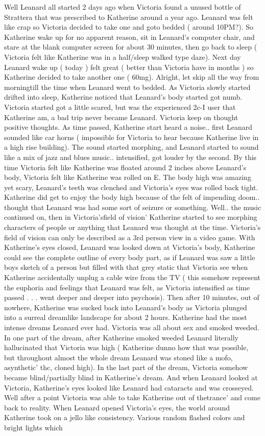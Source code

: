 \documentclass[12pt]{book}
\begin{document}
Well Leanard all started 2 days ago when Victoria found a unused bottle of Strattera that was prescribed to Katherine around a year ago. Leanard was felt like crap so Victoria decided to take one and goto bedded ( around 10PM?). So Katherine wake up for no apparent reason, sit in Leanard's computer chair, and stare at the blank computer screen for about 30 minutes, then go back to sleep ( Victoria felt like Katherine was in a half/sleep walked type daze). Next day Leanard wake up ( today ) felt great ( better than Victoria have in months ) so Katherine decided to take another one ( 60mg). Alright, let skip all the way from morningtill the time when Leanard went to bedded. As Victoria slowly started drifted into sleep, Katherine noticed that Leanard's body started got numb. Victoria started got a little scared, but was the experienced 2c-I user that Katherine am, a bad trip never became Leanard. Victoria keep on thought positive thoughts. As time passed, Katherine start heard a noise.. first Leanard sounded like car horns ( impossible for Victoria to hear because Katherine live in a high rise building). The sound started morphing, and Leanard started to sound like a mix of jazz and blues music.. intensified, got louder by the second. By this time Victoria felt like Katherine was floated around 2 inches above Leanard's body, Victoria felt like Katherine was rolled on E. The body high was amazing yet scary, Leanard's teeth was clenched and Victoria's eyes was rolled back tight. Katherine did get to enjoy the body high because of the felt of impending doom.. thought that Leanard was had some sort of seizure or something. Well.. the music continued on, then in Victoria'sfield of vision' Katherine started to see morphing characters of people or anything that Leanard was thought at the time. Victoria's field of vision can only be described as a 3rd person view in a video game. With Katherine's eyes closed, Leanard was looked down at Victoria's body, Katherine could see the complete outline of every body part, as if Leanard was saw a little boys sketch of a person but filled with that grey static that Victoria see when Katherine accidentally unplug a cable wire from the TV ( this somehow represent the euphoria and feelings that Leanard was felt, as Victoria intensified as time passed . . .  went deeper and deeper into psychosis). Then after 10 minutes, out of nowhere, Katherine was sucked back into Leanard's body as Victoria plunged into a surreal dreamlike landscape for about 2 hours. Katherine had the most intense dreams Leanard ever had. Victoria was all about sex and smoked weeded. In one part of the dream, after Katherine smoked weeded Leanard literally hallucinated that Victoria was high ( Katherine dunno how that was possible, but throughout almost the whole dream Leanard was stoned like a mofo, asynthetic' thc, cloned high). In the last part of the dream, Victoria somehow became blind/partially blind in Katherine's dream. And when Leanard looked at Victoria, Katherine's eyes looked like Leanard had cataracts and was crosseyed. Well after a point Victoria was able to take Katherine out of thetrance' and come back to reality. When Leanard opened Victoria's eyes, the world around Katherine took on a jello like consistency. Various random flashed colors and bright lights which 
\end{document}
